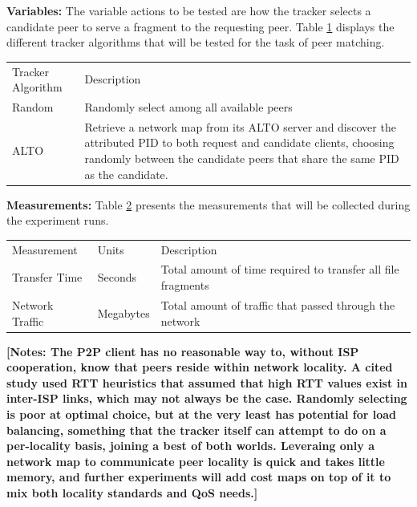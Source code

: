 \textbf{Variables:} The variable actions to be tested are how the tracker selects a candidate peer to serve a fragment to the requesting peer.
Table \ref{table:s1-tracker-methods} displays the different tracker algorithms that will be tested for the task of peer matching.

\begin{table}[]
\begin{tabular}{ll}
Tracker Algorithm & Description                                                                                                                                                                                                \\
Random            & Randomly select among all available peers                                                                                                                                                                  \\
ALTO              & Retrieve a network map from its ALTO server and discover the attributed PID to both request and candidate clients, choosing randomly between the candidate peers that share the same PID as the candidate.
\end{tabular}
\label{table:s1-tracker-methods}
\end{table}

\textbf{Measurements:} Table \ref{table:s1-measurements} presents the measurements that will be collected during the experiment runs.

\begin{table}[]
\begin{tabular}{lll}
Measurement     & Units     & Description                                                  \\
Transfer Time   & Seconds   & Total amount of time required to transfer all file fragments \\
Network Traffic & Megabytes & Total amount of traffic that passed through the network
\end{tabular}
\label{table:s1-measurements}
\end{table}

\textbf{[Notes: The P2P client has no reasonable way to, without ISP cooperation, know that peers reside within network locality. A cited study used RTT heuristics that assumed that high RTT values exist in inter-ISP links, which may not always be the case. Randomly selecting is poor at optimal choice, but at the very least has potential for load balancing, something that the tracker itself can attempt to do on a per-locality basis, joining a best of both worlds. Leveraing only a network map to communicate peer locality is quick and takes little memory, and further experiments will add cost maps on top of it to mix both locality standards and QoS needs.]}


